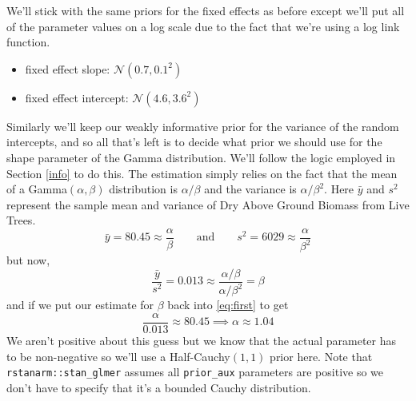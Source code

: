 \documentclass[12pt,twoside]{reedthesis}
\providecommand{\tightlist}{%
  \setlength{\itemsep}{0pt}\setlength{\parskip}{0pt}}
\begin{document}
We'll stick with the same priors for the fixed effects as before except we'll put all of the parameter values on a log scale due to the fact that we're using a log link function.
\begin{itemize}
\tightlist
\item
  fixed effect slope: \(\mathcal{N}(0.7, 0.1^2)\)
\item
  fixed effect intercept: \(\mathcal{N}(4.6, 3.6^2)\)
\end{itemize}
Similarly we'll keep our weakly informative prior for the variance of the random intercepts, and so all that's left is to decide what prior we should use for the shape parameter of the Gamma distribution. We'll follow the logic employed in Section \ref{info} to do this. The estimation simply relies on the fact that the mean of a Gamma\((\alpha, \beta)\) distribution is \(\alpha/\beta\) and the variance is \(\alpha/\beta^2\). Here \(\bar{y}\) and \(s^2\) represent the sample mean and variance of Dry Above Ground Biomass from Live Trees.
\begin{equation}
\bar{y} = 80.45 \approx \frac{\alpha}{\beta}\qquad \text{and} \qquad s^2 = 6029 \approx \frac{\alpha}{\beta^2}
\label{eq:first}
\end{equation}
but now,
\begin{equation}
\frac{\bar{y}}{s^2} = 0.013 \approx \frac{\alpha / \beta}{\alpha / \beta^2} = \beta 
\end{equation}
and if we put our estimate for \(\beta\) back into \eqref{eq:first} to get
\begin{equation}
\frac{\alpha}{0.013} \approx 80.45 \implies \alpha \approx 1.04
\end{equation}
We aren't positive about this guess but we know that the actual parameter has to be non-negative so we'll use a Half-Cauchy\((1, 1)\) prior here. Note that \texttt{rstanarm::stan\_glmer} assumes all \texttt{prior\_aux} parameters are positive so we don't have to specify that it's a bounded Cauchy distribution.
\end{document}
